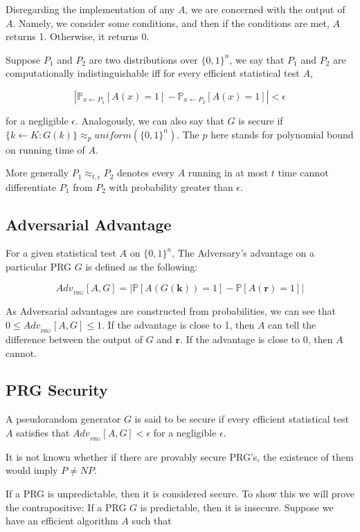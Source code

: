 \documentclass{article}
\begin{document}
\begin{multicols}{2}
Disregarding the implementation of any $A$, we are concerned with the output of $A$. Namely, we consider some conditions, and then if the conditions are met, $A$ returns 1. Otherwise, it returns 0.

Suppose $P_1$ and $P_2$ are two distributions over $\{0,1\}^n$, we say that $P_1$ and $P_2$ are computationally indistinguishable iff for every efficient statistical test $A$,

$$
|\mathbb{P}_{x \leftarrow P_1}[A(x) = 1] - \mathbb{P}_{x \leftarrow P_2}[A(x) = 1]| < \epsilon
$$

for a negligible $\epsilon$. Analogously, we can also say that $G$ is secure if $\{k \leftarrow K : G(k)\} \approx_p uniform(\{0,1\}^n)$. The $p$ here stands for polynomial bound on running time of $A$.

More generally $P_1 \approx_{t,\epsilon} P_2$ denotes every $A$ running in at most $t$ time cannot differentiate $P_1$ from $P_2$ with probability greater than $\epsilon$.

\subsection {Adversarial Advantage}

For a given statistical test $A$ on $\{0,1\}^n$, The Adversary's advantage on a particular PRG $G$ is defined as the following:

$$
Adv_{_{PRG}}[A, G] = | \mathbb{P}[A(G(\mathbf{k})) = 1] - \mathbb{P}[A(\mathbf{r}) = 1] |
$$

As Adversarial advantages are constructed from probabilities, we can see that $0 \leq Adv_{_{PRG}}[A, G] \leq 1$. If the advantage is close to 1, then $A$ can tell the difference between the output of $G$ and $\mathbf{r}$. If the advantage is close to 0, then $A$ cannot. 

\subsection {PRG Security}

A pseudorandom generator $G$ is said to be secure if every efficient statistical test $A$ satisfies that $Adv_{_{PRG}}[A, G] < \epsilon$ for a negligible $\epsilon$.

It is not known whether if there are provably secure PRG's, the existence of them would imply $P \neq NP$.

If a PRG is unpredictable, then it is considered secure. To show this we will prove the contrapositive: If a PRG $G$ is predictable, then it is insecure. Suppose we have an efficient algorithm $A$ such that 


\end{multicols}
\end{document}
